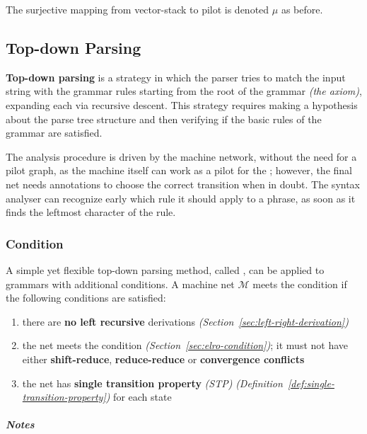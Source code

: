 \documentclass[english]{article}
\begin{document}
\bigskip
The surjective mapping from vector-stack \mstates to pilot \mstates is denoted \(\mu\) as before.

\subsection{Top-down Parsing}
\label{sec:top-down}

\textbf{Top-down parsing} is a strategy in which the parser tries to match the input string with the grammar rules starting from the root of the grammar \textit{(the axiom)}, expanding each \RP via recursive descent.
This strategy requires making a hypothesis about the parse tree structure and then verifying if the basic rules of the grammar are satisfied.

\bigskip
The analysis procedure is driven by the machine network, without the need for a pilot graph, as the machine itself can work as a pilot for the \PDA;
however, the final net needs annotations to choose the correct transition when in doubt.
The syntax analyser can recognize early which rule it should apply to a phrase, as soon as it finds the leftmost character of the rule.

\subsubsection[ELL(1) Condition]{\ello Condition}

A simple yet flexible top-down parsing method, called \ello, can be applied to \elro grammars with additional conditions.
A machine net \(\mathcal{M}\) meets the \ello condition if the following conditions are satisfied:

\begin{enumerate}[label=\arabic*., ref=(\arabic*)]
  \item\label{enum:ell1-condition-1} there are \textbf{no left recursive} derivations \textit{(Section~\ref{sec:left-right-derivation})}
  \item\label{enum:ell1-condition-2} the net meets the \elro condition \textit{(Section~\ref{sec:elro-condition})}; it must not have either \textbf{shift-reduce}, \textbf{reduce-reduce} or \textbf{convergence conflicts}
  \item\label{enum:ell1-condition-3} the net has \textbf{single transition property} \textit{(STP)} \textit{(Definition~\ref{def:single-transition-property})} for each state
\end{enumerate}

\subparagraph*{Notes}
\end{document}
